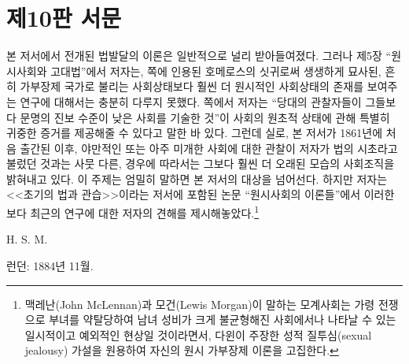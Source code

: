 \chapter*{제10판 서문}

본 저서에서 전개된 법발달의 이론은 일반적으로 널리 받아들여졌다.
그러나
제5장 ``원시사회와 고대법''에서
저자는,
\pageref{cyclops}쪽에 인용된
호메로스의 싯귀로써 생생하게 묘사된,
흔히 가부장제 국가로 불리는
사회상태보다
훨씬 더 원시적인 사회상태의 존재를 보여주는 연구에 대해서는
충분히 다루지 못했다.
\pageref{contemporary}쪽에서 저자는
``당대의 관찰자들이 그들보다 문명의 진보 수준이 낮은 사회를 기술한 것''이
사회의 원초적 상태에 관해 특별히 귀중한 증거를 제공해줄 수 있다고
말한 바 있다.
그런데 실로,
본 저서가 1861년에 처음 출간된 이후,
야만적인 또는 아주 미개한 사회에 대한 관찰이
저자가 법의 시초라고 불렀던 것과는 사뭇 다른,
경우에 따라서는 그보다 훨씬 더 오래된
모습의 사회조직을 밝혀내고 있다.
이 주제는 엄밀히 말하면 본 저서의 대상을 넘어선다.
하지만
저자는
<<초기의 법과 관습>>이라는
저서에 포함된 논문
``원시사회의 이론들''에서
이러한 보다 최근의 연구에 대한 저자의 견해를 제시해놓았다.\footnote{%
  맥레난(John McLennan)과 모건(Lewis Morgan)이 말하는 모계사회는
  가령 전쟁으로 부녀를 약탈당하여 남녀 성비가 크게 불균형해진 사회에서나
  나타날 수 있는 일시적이고 예외적인 현상일 것이라면서,
  다윈이 주장한 성적 질투심(sexual jealousy) 가설을 원용하여
  자신의 원시 가부장제 이론을 고집한다.
}

\begin{flushright}
H. S. M.
\end{flushright}

\begin{footnotesize}
런던: 1884년 11월.
\end{footnotesize}

